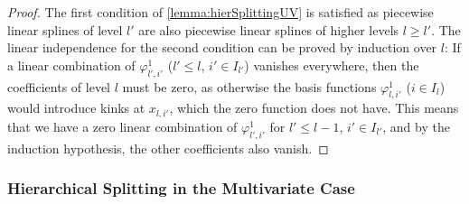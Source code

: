 \begin{proof}
  The first condition of \cref{lemma:hierSplittingUV}
  is satisfied as piecewise linear splines of level $l'$
  are also piecewise linear splines of higher levels $l \ge l'$.
  The linear independence for the second condition can be proved by induction
  over $l$:
  If a linear combination of $\varphi_{l',i'}^1$ ($l' \le l$, $i' \in I_{l'}$)
  vanishes everywhere, then the coefficients of level $l$ must be zero,
  as otherwise the basis functions $\varphi_{l,i'}^1$ ($i \in I_l$) would
  introduce kinks at $x_{l,i'}$, which the zero function does not have.
  This means that we have a zero linear combination of $\varphi_{l',i'}^1$ for
  $l' \le l - 1$, $i' \in I_{l'}$,
  and by the induction hypothesis, the other coefficients also vanish.
\end{proof}

\subsubsection{Hierarchical Splitting in the Multivariate Case}

